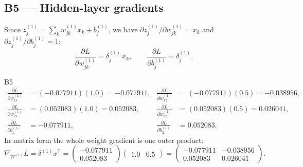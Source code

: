 \documentclass[11pt]{article}
\begin{document}
\subsection{B5 --- Hidden-layer gradients}
Since $z^{(1)}_j=\sum_k w^{(1)}_{jk}x_k+b^{(1)}_j$, we have $\partial z^{(1)}_j/\partial w^{(1)}_{jk}=x_k$ and $\partial z^{(1)}_j/\partial b^{(1)}_j=1$:
\[
\frac{\partial L}{\partial w^{(1)}_{jk}}=\delta^{(1)}_j\,x_k,\qquad \frac{\partial L}{\partial b^{(1)}_j}=\delta^{(1)}_j .
\]
\begin{example}{B5}
\begin{align*}
\frac{\partial L}{\partial w^{(1)}_{11}}&=(-0.077911)(1.0)=\mathbf{-0.077911}, &
\frac{\partial L}{\partial w^{(1)}_{12}}&=(-0.077911)(0.5)=\mathbf{-0.038956},\\
\frac{\partial L}{\partial w^{(1)}_{21}}&=(0.052083)(1.0)=\mathbf{0.052083}, &
\frac{\partial L}{\partial w^{(1)}_{22}}&=(0.052083)(0.5)=\mathbf{0.026041},\\
\frac{\partial L}{\partial b^{(1)}_{1}}&=\mathbf{-0.077911}, &
\frac{\partial L}{\partial b^{(1)}_{2}}&=\mathbf{0.052083}.
\end{align*}
In matrix form the whole weight gradient is one outer product:
\[
\nabla_{W^{(1)}}L=\delta^{(1)}x^{\mathsf T}=\begin{pmatrix}-0.077911\\0.052083\end{pmatrix}\begin{pmatrix}1.0&0.5\end{pmatrix}
=\begin{pmatrix}-0.077911&-0.038956\\0.052083&0.026041\end{pmatrix}.
\]
\end{example}
\end{document}
